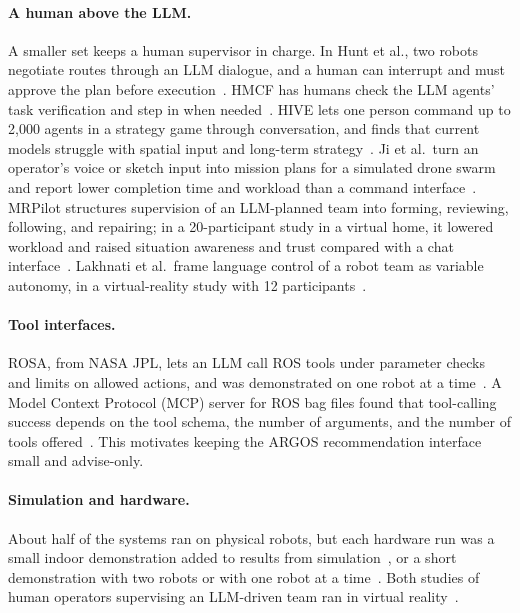 \paragraph{A human above the LLM.}
A smaller set keeps a human supervisor in charge.
In Hunt et al., two robots negotiate routes through an LLM dialogue, and a human can interrupt and must approve the plan before execution~\citep{hunt2024conversational}.
HMCF has humans check the LLM agents' task verification and step in when needed~\citep{li2025hmcf}.
HIVE lets one person command up to 2{,}000 agents in a strategy game through conversation, and finds that current models struggle with spatial input and long-term strategy~\citep{anne2025hive}.
Ji et al.\ turn an operator's voice or sketch input into mission plans for a simulated drone swarm and report lower completion time and workload than a command interface~\citep{ji2025humanswarm}.
MRPilot structures supervision of an LLM-planned team into forming, reviewing, following, and repairing; in a 20-participant study in a virtual home, it lowered workload and raised situation awareness and trust compared with a chat interface~\citep{yang2026mrpilot}.
Lakhnati et al.\ frame language control of a robot team as variable autonomy, in a virtual-reality study with 12 participants~\citep{lakhnati2024variable}.

\paragraph{Tool interfaces.}
ROSA, from NASA JPL, lets an LLM call ROS tools under parameter checks and limits on allowed actions, and was demonstrated on one robot at a time~\citep{royce2025rosa}.
A Model Context Protocol (MCP) server for ROS bag files found that tool-calling success depends on the tool schema, the number of arguments, and the number of tools offered~\citep{fu2025rosbagmcp}.
This motivates keeping the ARGOS recommendation interface small and advise-only.

\paragraph{Simulation and hardware.}
About half of the systems ran on physical robots, but each hardware run was a small indoor demonstration added to results from simulation~\citep{yu2026conavgpt,liu2025coherent,wang2025comresvlm,li2025hmcf}, or a short demonstration with two robots or with one robot at a time~\citep{mandi2024roco,hunt2024conversational,royce2025rosa}.
Both studies of human operators supervising an LLM-driven team ran in virtual reality~\citep{yang2026mrpilot,lakhnati2024variable}.

